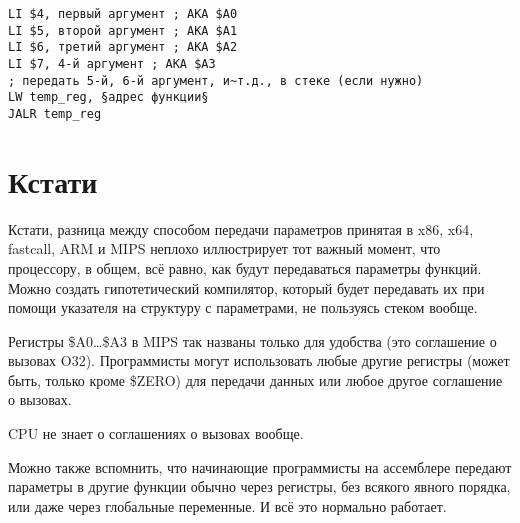 \begin{lstlisting}[caption=MIPS (соглашение о вызовах O32)]
LI $4, первый аргумент ; AKA $A0
LI $5, второй аргумент ; AKA $A1
LI $6, третий аргумент ; AKA $A2
LI $7, 4-й аргумент ; AKA $A3
; передать 5-й, 6-й аргумент, и~т.д., в стеке (если нужно)
LW temp_reg, §адрес функции§
JALR temp_reg
\end{lstlisting}

\section{Кстати}

Кстати, разница между способом передачи параметров принятая в x86, x64, fastcall, ARM и MIPS неплохо иллюстрирует тот важный момент, что процессору, в общем, всё равно, как будут 
передаваться параметры функций. Можно создать гипотетический компилятор, который будет передавать их при 
помощи указателя на структуру с параметрами, не пользуясь стеком вообще.

Регистры \$A0\dots \$A3 в MIPS так названы только для удобства (это соглашение о вызовах O32).
Программисты могут использовать любые другие регистры (может быть, только кроме \$ZERO) для
передачи данных или любое другое соглашение о вызовах.

\ac{CPU} не знает о соглашениях о вызовах вообще.

Можно также вспомнить, что начинающие программисты на ассемблере передают параметры 
в другие функции обычно через регистры, без всякого явного порядка, или даже через глобальные переменные.
И всё это нормально работает.

